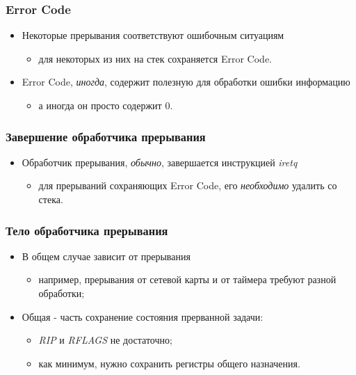 \begin{frame}
\frametitle{Error Code}
\begin{itemize}
    \item<1-> Некоторые прерывания соответствуют ошибочным ситуациям
    \begin{itemize}
        \item<1-> для некоторых из них на стек сохраняется Error Code.
    \end{itemize}
    \item<2-> Error Code, \emph{иногда}, содержит полезную для обработки
    ошибки информацию
    \begin{itemize}
        \item<3-> а иногда он просто содержит 0.
    \end{itemize}
\end{itemize}
\end{frame}

\begin{frame}
\frametitle{Завершение обработчика прерывания}
\begin{itemize}
    \item<1-> Обработчик прерывания, \emph{обычно}, завершается
    инструкцией \emph{iretq}
    \begin{itemize}
        \item для прерываний сохраняющих Error Code, его \emph{необходимо}
        удалить со стека.
    \end{itemize}
\end{itemize}
\end{frame}

\begin{frame}
\frametitle{Тело обработчика прерывания}
\begin{itemize}
    \item<1->В общем случае зависит от прерывания
    \begin{itemize}
        \item например, прерывания от сетевой карты и от таймера требуют
        разной обработки;
    \end{itemize}
    \item<2->Общая - часть сохранение состояния прерванной задачи:
    \begin{itemize}
        \item \emph{RIP} и \emph{RFLAGS} не достаточно;
        \item<3->как минимум, нужно сохранить регистры общего назначения.
    \end{itemize}
\end{itemize}
\end{frame}

